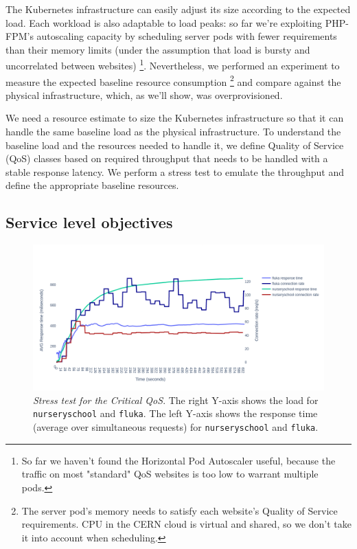 The Kubernetes infrastructure can easily adjust its size according to the expected load.
Each workload is also adaptable to load peaks:
so far we're exploiting PHP-FPM's autoscaling capacity by scheduling server pods with fewer requirements than their memory limits
(under the assumption that load is bursty and uncorrelated between websites)
\footnote{So far we haven't found the Horizontal Pod Autoscaler useful, because the traffic on most "standard" QoS websites is too low to warrant multiple pods.}.
Nevertheless, we performed an experiment to measure the expected baseline resource consumption
\footnote{The server pod's memory needs to satisfy each website's Quality of Service requirements.
CPU in the CERN cloud is virtual and shared, so we don't take it into account when scheduling.}
and compare against the physical infrastructure, which, as we'll show, was overprovisioned.

We need a resource estimate to size the Kubernetes infrastructure so that it can handle the same baseline load as the physical infrastructure.
To understand the baseline load and the resources needed to handle it, we define Quality of Service (QoS) classes based on required throughput
that needs to be handled with a stable response latency.
We perform a stress test to emulate the throughput and define the appropriate baseline resources.

\subsection{Service level objectives}

\begin{figure}[t]
\centering
\captionsetup{justification=centering,margin=0.3cm}
\vspace{-2em}
\includegraphics[width=1.1\linewidth]{figures/experiment-figures/critical_run.png}
\caption{\emph{Stress test for the Critical QoS}.
The right Y-axis shows the load for {\color[HTML]{b22222} \texttt{nurseryschool}} and {\color[HTML]{0000A0} \texttt{fluka}}.
The left Y-axis shows the response time (average over simultaneous requests) for {\color[HTML]{23CDCD} \texttt{nurseryschool}} and {\color[HTML]{636efa} \texttt{fluka}}.}
\label{stress_usage}
\vspace{-2em}
\end{figure}

